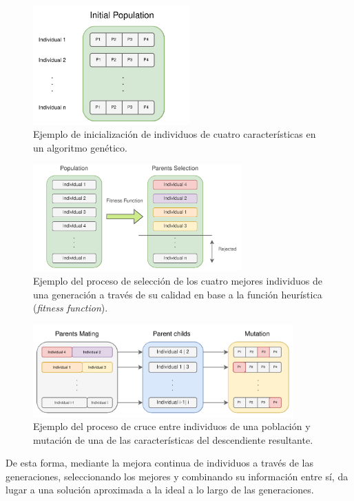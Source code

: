 \documentclass{uathesis-es}
\begin{document}
	\begin{figure}[h]
		\centering
		\includegraphics[width=6cm]{Figures/GA/inicializacion.png}
		\caption{Ejemplo de inicialización de individuos de cuatro características en un algoritmo genético.}
		\label{GA_inicializacion}
	\end{figure}
	\begin{figure}[h]
		\centering
		\includegraphics[width=8cm]{Figures/GA/selection.png}
		\caption{Ejemplo del proceso de selección de los cuatro mejores individuos de una generación a través de su calidad en base a la función heurística (\textit{fitness function}).}
		\label{GA_selection}
	\end{figure}
	\begin{figure}[h]
		\centering
		\includegraphics[width=10cm]{Figures/GA/cruce_mutacion.png}
		\caption{Ejemplo del proceso de cruce entre individuos de una población y mutación de una de las características del descendiente resultante.}
		\label{GA_cruce_mutacion}
	\end{figure}
	
	De esta forma, mediante la mejora continua de individuos a través de las generaciones, seleccionando los mejores y combinando su información entre sí, da lugar a una solución aproximada a la ideal a lo largo de las generaciones.
	
\end{document}
